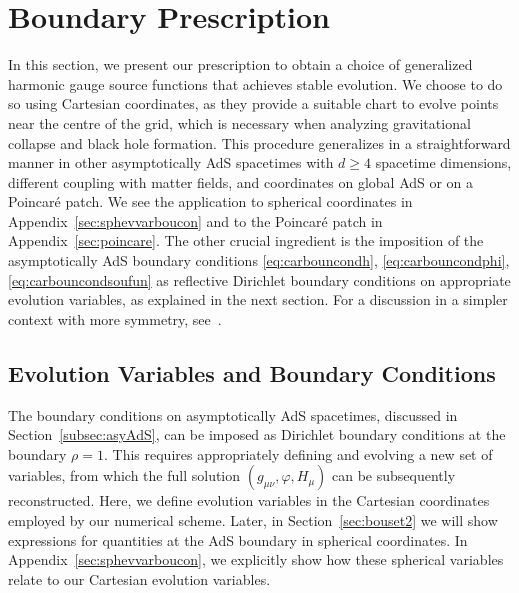 \documentclass[a4paper,11pt]{article}
\numberwithin{equation}{section}
\begin{document}
\section{Boundary Prescription}\label{sec:pre_sta}

In this section, we present our prescription to obtain a choice of generalized harmonic gauge source functions that achieves stable evolution.
We choose to do so using Cartesian coordinates, as they provide a suitable chart to evolve points near the centre of the grid, which is necessary when analyzing gravitational collapse and black hole formation. This procedure generalizes in a straightforward manner in other asymptotically AdS spacetimes with $d\geq 4$ spacetime dimensions, different coupling with matter fields, and coordinates on global AdS or on a Poincar\'{e} patch. We see the application to spherical coordinates in Appendix~\ref{sec:sphevvarboucon} and to the Poincar\'e patch in Appendix~\ref{sec:poincare}.
The other crucial ingredient is the imposition of the asymptotically AdS boundary conditions \eqref{eq:carbouncondh}, \eqref{eq:carbouncondphi}, \eqref{eq:carbouncondsoufun} as reflective Dirichlet boundary conditions on appropriate evolution variables, as explained in the next section.
For a discussion in a simpler context with more symmetry, see~\cite{Bantilan:2012vu}.

\subsection{Evolution Variables and Boundary Conditions}\label{subsec:cartevvarboucon}

The boundary conditions on asymptotically AdS spacetimes, discussed in Section~\ref{subsec:asyAdS}, can be imposed as Dirichlet boundary conditions at the boundary $\rho=1$.
This requires appropriately defining and evolving a new set of variables, from which the full solution $(g_{\mu\nu},\varphi,H_\mu)$ can be subsequently reconstructed. 
Here, we define evolution variables in the Cartesian coordinates employed by our numerical scheme.
Later, in Section~\ref{sec:bouset2} we will show expressions for quantities at the AdS boundary in spherical coordinates.
In Appendix~\ref{sec:sphevvarboucon}, we explicitly show how these spherical variables relate to our Cartesian evolution variables.
\end{document}

